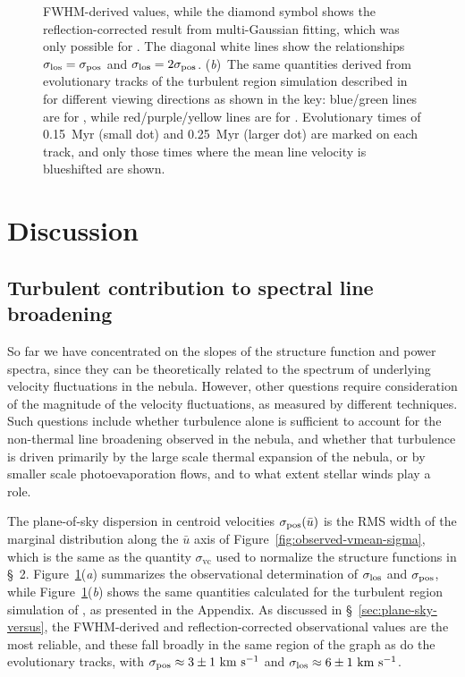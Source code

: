 \documentclass[useAMS,usenatbib]{mn2e}
\begin{document}
\begin{figure}
{    FWHM-derived values, while the diamond symbol shows the
    reflection-corrected result from multi-Gaussian fitting, which was
    only possible for \oiii.  The diagonal white lines show the
    relationships \(\sigma_{\mathrm{los}} = \sigma_{\mathrm{pos}}\) and \(\sigma_{\mathrm{los}} =
    2\sigma_{\mathrm{pos}}\).  (\textit{b})~The same quantities derived
    from evolutionary tracks of the turbulent \hii{} region simulation
    described in \citet{Medina:2014a} for different viewing directions
    as shown in the key: blue/green lines are for \nii{}, while
    red/purple/yellow lines are for \oiii{}. Evolutionary times of
    0.15~Myr (small dot) and 0.25~Myr (larger dot) are marked on each
    track, and only those times where the mean line velocity is
    blueshifted are shown.  }
  \label{fig:obs-sigma-sigma}
\end{figure}

\section{Discussion}
\addtocounter{subsection}{2}
\subsection{Turbulent contribution to spectral line broadening}
\label{sec:turb-contr-spectr}
So far we have concentrated on the slopes of the structure function
and power spectra, since they can be theoretically related to the
spectrum of underlying velocity fluctuations in the nebula.  However,
other questions require consideration of the magnitude of the velocity
fluctuations, as measured by different techniques.  Such questions
include whether turbulence alone is sufficient to account for the non-thermal
line broadening observed in the nebula, and whether that turbulence is
driven primarily by the large scale thermal expansion of the nebula,
or by smaller scale photoevaporation flows, and to what extent stellar
winds play a role. 

The plane-of-sky dispersion in centroid velocities
\(\sigma_{\mathrm{pos}}(\bar{u})\) is the RMS width of the marginal distribution
along the \(\bar{u}\) axis of Figure~\ref{fig:observed-vmean-sigma},
which is the same as the quantity \(\sigma_{\mathrm{vc}}\) used to
normalize the structure functions in \S~2.
Figure~\ref{fig:obs-sigma-sigma}(\textit{a}) summarizes the
observational determination of \(\sigma_{\mathrm{los}}\) and \(\sigma_{\mathrm{pos}}\),
while Figure~\ref{fig:obs-sigma-sigma}(\textit{b}) shows the same
quantities calculated for the turbulent \hii{} region simulation of
\citet{Medina:2014a}, as presented in the Appendix.  As discussed in
\S~\ref{sec:plane-sky-versus}, the FWHM-derived and
reflection-corrected observational values are the most reliable, and
these fall broadly in the same region of the graph as do the
evolutionary tracks, with \(\sigma_{\mathrm{pos}} \approx 3 \pm 1 \ \mathrm{km\ s^{-1}}\) and
\(\sigma_{\mathrm{los}} \approx 6 \pm 1 \ \mathrm{km\ s^{-1}}\).
\end{document}
